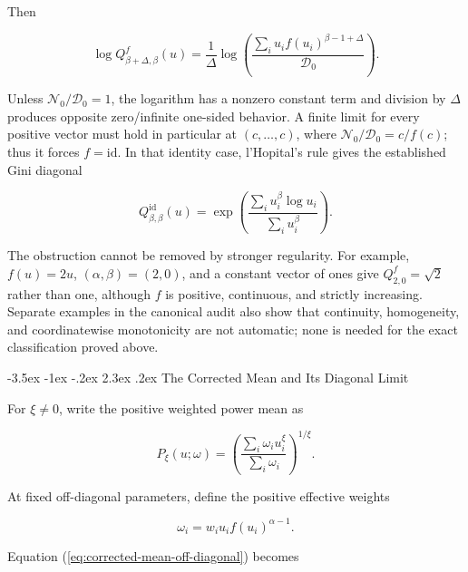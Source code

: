 \documentclass[12pt,a4paper,oneside]{report}
\makeatletter
\renewcommand\section{\@startsection{section}{1}{\z@}%
  {-3.5ex \@plus -1ex \@minus -.2ex}%
  {2.3ex \@plus .2ex}%
  {\normalfont\fontsize{14}{17}\selectfont\bfseries}}
\makeatother
\begin{document}
Then

\begin{equation}
  \log Q_{\beta+\Delta,\beta}^{f}(u)
  =\frac{1}{\Delta}\log\left(
    \frac{\sum_i u_i f(u_i)^{\beta-1+\Delta}}{\mathcal D_0}
  \right).
  \label{eq:appendix-source-diagonal-log}
\end{equation}

Unless $\mathcal N_0/\mathcal D_0=1$, the logarithm has a nonzero constant term and division by
$\Delta$ produces opposite zero/infinite one-sided behavior. A finite limit
for every positive vector must hold in particular at $(c,\ldots,c)$, where
$\mathcal N_0/\mathcal D_0=c/f(c)$; thus it forces $f=\mathrm{id}$. In that identity case,
l'Hopital's rule gives the established Gini diagonal

\begin{equation}
  Q_{\beta,\beta}^{\mathrm{id}}(u)
  =\exp\left(
    \frac{\sum_i u_i^\beta\log u_i}{\sum_i u_i^\beta}
  \right).
  \label{eq:appendix-source-diagonal}
\end{equation}

The obstruction cannot be removed by stronger regularity. For example,
$f(u)=2u$, $(\alpha,\beta)=(2,0)$, and a constant vector of ones give
$Q_{2,0}^{f}=\sqrt{2}$ rather than one, although $f$ is positive,
continuous, and strictly increasing. Separate examples in the canonical audit
also show that continuity, homogeneity, and coordinatewise monotonicity are not
automatic; none is needed for the exact classification proved above.

\section{The Corrected Mean and Its Diagonal Limit}
\label{sec:proof-corrected-mean}

For $\xi\neq0$, write the positive weighted power mean as

\begin{equation}
  P_\xi(u;\omega)
  =\left(\frac{\sum_i\omega_i u_i^\xi}{\sum_i\omega_i}\right)^{1/\xi}.
  \label{eq:weighted-power-definition}
\end{equation}

At fixed off-diagonal parameters, define the positive effective weights

\begin{equation}
  \omega_i=w_i u_i f(u_i)^{\alpha-1}.
  \label{eq:corrected-power-weights}
\end{equation}

Equation (\ref{eq:corrected-mean-off-diagonal}) becomes
\end{document}
